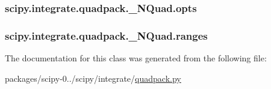 \subsubsection[{opts}]{\setlength{\rightskip}{0pt plus 5cm}scipy.\+integrate.\+quadpack.\+\_\+\+N\+Quad.\+opts}\label{classscipy_1_1integrate_1_1quadpack_1_1__NQuad_a8e88f1d511392624830349828c464a97}
\hypertarget{classscipy_1_1integrate_1_1quadpack_1_1__NQuad_aa3fb7006a6d0c9e2ffc933ab1795a004}{}
\subsubsection[{ranges}]{\setlength{\rightskip}{0pt plus 5cm}scipy.\+integrate.\+quadpack.\+\_\+\+N\+Quad.\+ranges}\label{classscipy_1_1integrate_1_1quadpack_1_1__NQuad_aa3fb7006a6d0c9e2ffc933ab1795a004}


The documentation for this class was generated from the following file\+:\begin{DoxyCompactItemize}
\item 
packages/scipy-\/0../scipy/integrate/\hyperlink{quadpack_8py}{quadpack.\+py}\end{DoxyCompactItemize}

